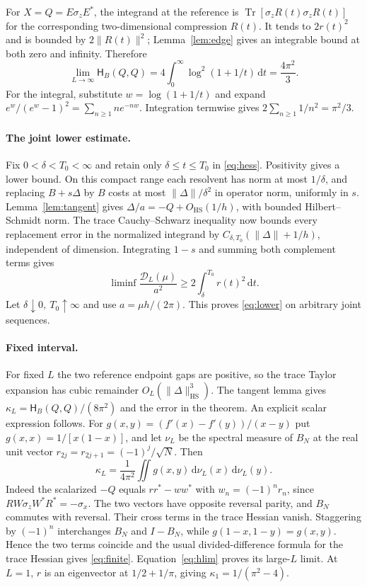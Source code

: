 \documentclass[11pt,letterpaper]{article}
\newcommand{\Tr}{\operatorname{Tr}}
\newcommand{\HS}{\mathrm{HS}}
\newcommand{\cD}{\mathcal D}
\newcommand{\cH}{\mathsf H}
\newcommand{\dd}{\,\mathrm d}
\begin{document}
For \(X=Q=E\sigma_z E^*\), the integrand at the reference is \(\Tr[\sigma_z R(t)\sigma_z R(t)]\) for the corresponding two-dimensional compression \(R(t)\). It tends to \(2r(t)^2\) and is bounded by \(2\|R(t)\|^2\); Lemma~\ref{lem:edge} gives an integrable bound at both zero and infinity. Therefore
\begin{equation}
 \lim_{L\to\infty}\cH_B(Q,Q)=4\int_0^\infty\log^2(1+1/t)\dd t
        =\frac{4\pi^2}{3}.\label{eq:hlim}
\end{equation}
For the integral, substitute \(w=\log(1+1/t)\) and expand \(e^w/(e^w-1)^2=\sum_{n\ge1}ne^{-nw}\). Integration termwise gives \(2\sum_{n\ge1}1/n^2=\pi^2/3\).

\paragraph{The joint lower estimate.}
Fix \(0<\delta<T_0<\infty\) and retain only \(\delta\le t\le T_0\) in \eqref{eq:hess}. Positivity gives a lower bound. On this compact range each resolvent has norm at most \(1/\delta\), and replacing \(B+s\Delta\) by \(B\) costs at most \(\|\Delta\|/\delta^2\) in operator norm, uniformly in \(s\). Lemma~\ref{lem:tangent} gives \(\Delta/a=-Q+O_{\HS}(1/h)\), with bounded Hilbert--Schmidt norm. The trace Cauchy--Schwarz inequality now bounds every replacement error in the normalized integrand by \(C_{\delta,T_0}(\|\Delta\|+1/h)\), independent of dimension. Integrating \(1-s\) and summing both complement terms gives
\[
 \liminf\frac{\cD_L(\mu)}{a^2}\ge 2\int_\delta^{T_0}r(t)^2\dd t.
\]
Let \(\delta\downarrow0,\ T_0\uparrow\infty\) and use \(a=\mu h/(2\pi)\). This proves \eqref{eq:lower} on arbitrary joint sequences.

\paragraph{Fixed interval.}
For fixed \(L\) the two reference endpoint gaps are positive, so the trace Taylor expansion has cubic remainder \(O_L(\|\Delta\|_{\HS}^3)\). The tangent lemma gives \(\kappa_L=\cH_B(Q,Q)/(8\pi^2)\) and the error in the theorem. An explicit scalar expression follows. For \(g(x,y)=(f'(x)-f'(y))/(x-y)\) put \(g(x,x)=1/[x(1-x)]\), and let \(\nu_L\) be the spectral measure of \(B_N\) at the real unit vector \(r_{2j}=r_{2j+1}=(-1)^j/\sqrt N\). Then
\begin{equation}
 \kappa_L=\frac1{4\pi^2}\iint g(x,y)\dd\nu_L(x)\dd\nu_L(y).
 \label{eq:finite}
\end{equation}
Indeed the scalarized \(-Q\) equals \(rr^*-ww^*\) with \(w_n=(-1)^n r_n\), since \(RW\sigma_zW^*R^*=-\sigma_x\). The two vectors have opposite reversal parity, and \(B_N\) commutes with reversal. Their cross terms in the trace Hessian vanish. Staggering by \((-1)^n\) interchanges \(B_N\) and \(I-B_N\), while \(g(1-x,1-y)=g(x,y)\). Hence the two terms coincide and the usual divided-difference formula for the trace Hessian gives \eqref{eq:finite}. Equation~\eqref{eq:hlim} proves its large-\(L\) limit. At \(L=1\), \(r\) is an eigenvector at \(1/2+1/\pi\), giving \(\kappa_1=1/(\pi^2-4)\).
\end{document}
